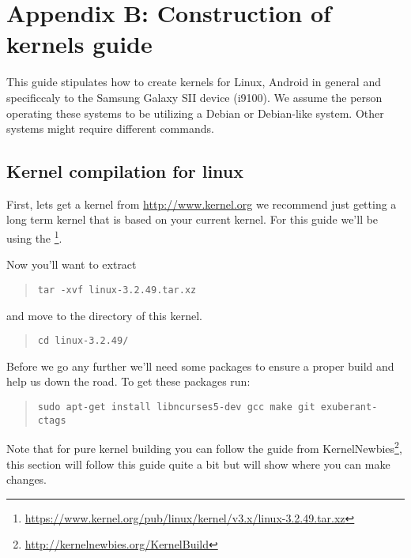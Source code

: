 \chapter*{Appendix B: Construction of kernels guide}
\label{chap:app-b}


This guide stipulates how to create kernels for Linux, Android in general and specificcaly to the Samsung Galaxy SII device (i9100). We assume the person operating these systems to be utilizing a Debian or Debian-like system. Other systems might require different commands. 

\section*{Kernel compilation for linux}

First, lets get a kernel from \url{http://www.kernel.org} we recommend just getting a long term kernel that is based on your current kernel. For this guide we'll be using the \footnote{\url{https://www.kernel.org/pub/linux/kernel/v3.x/linux-3.2.49.tar.xz}}.

\npar

Now you'll want to extract 
\begin{quote} \begin{verbatim}tar -xvf linux-3.2.49.tar.xz \end{verbatim} \end{quote} 
and move to the directory of this kernel.
\begin{quote} \begin{verbatim}cd linux-3.2.49/ \end{verbatim} \end{quote}

\npar

Before we go any further we'll need some packages to ensure a proper build and help us down the road. To get these packages run:

\begin{quote} \begin{verbatim}sudo apt-get install libncurses5-dev gcc make git exuberant-ctags \end{verbatim} \end{quote}

Note that for pure kernel building you can follow the guide from KernelNewbies\footnote{\url{http://kernelnewbies.org/KernelBuild}}, this section will follow this guide quite a bit but will show where you can make changes.


